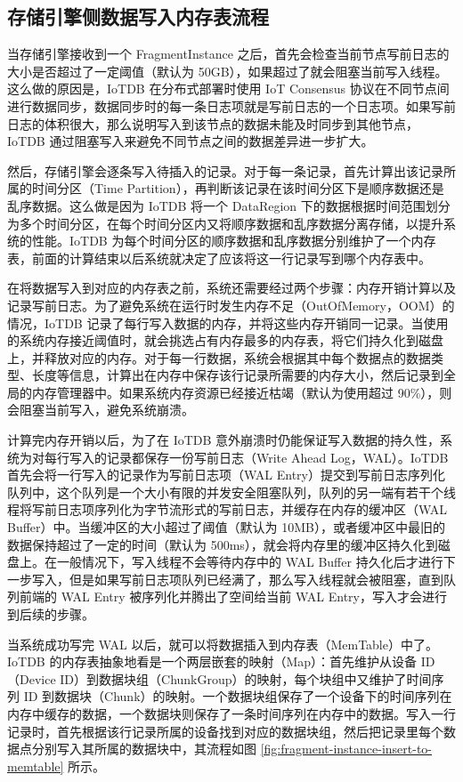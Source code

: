 \subsection{存储引擎侧数据写入内存表流程}
当存储引擎接收到一个 FragmentInstance 之后，首先会检查当前节点写前日志的大小是否超过了一定阈值（默认为 50GB），如果超过了就会阻塞当前写入线程。这么做的原因是，IoTDB 在分布式部署时使用 IoT Consensus 协议在不同节点间进行数据同步\cite{wang2023apache}，数据同步时的每一条日志项就是写前日志的一个日志项。如果写前日志的体积很大，那么说明写入到该节点的数据未能及时同步到其他节点，IoTDB 通过阻塞写入来避免不同节点之间的数据差异进一步扩大。

然后，存储引擎会逐条写入待插入的记录。对于每一条记录，首先计算出该记录所属的时间分区（Time Partition），再判断该记录在该时间分区下是顺序数据还是乱序数据。这么做是因为 IoTDB 将一个 DataRegion 下的数据根据时间范围划分为多个时间分区，在每个时间分区内又将顺序数据和乱序数据分离存储，以提升系统的性能。IoTDB 为每个时间分区的顺序数据和乱序数据分别维护了一个内存表，前面的计算结束以后系统就决定了应该将这一行记录写到哪个内存表中。

在将数据写入到对应的内存表之前，系统还需要经过两个步骤：内存开销计算以及记录写前日志。为了避免系统在运行时发生内存不足（OutOfMemory，OOM）的情况，IoTDB 记录了每行写入数据的内存，并将这些内存开销同一记录。当使用的系统内存接近阈值时，就会挑选占有内存最多的内存表，将它们持久化到磁盘上，并释放对应的内存。对于每一行数据，系统会根据其中每个数据点的数据类型、长度等信息，计算出在内存中保存该行记录所需要的内存大小，然后记录到全局的内存管理器中。如果系统内存资源已经接近枯竭（默认为使用超过 90\%），则会阻塞当前写入，避免系统崩溃。

计算完内存开销以后，为了在 IoTDB 意外崩溃时仍能保证写入数据的持久性，系统为对每行写入的记录都保存一份写前日志（Write Ahead Log，WAL）。IoTDB 首先会将一行写入的记录作为写前日志项（WAL Entry）提交到写前日志序列化队列中，这个队列是一个大小有限的并发安全阻塞队列，队列的另一端有若干个线程将写前日志项序列化为字节流形式的写前日志，并缓存在内存的缓冲区（WAL Buffer）中。当缓冲区的大小超过了阈值（默认为 10MB），或者缓冲区中最旧的数据保持超过了一定的时间（默认为 500ms），就会将内存里的缓冲区持久化到磁盘上\cite{朱海铭2023面向内存表的可动态配置预写日志框架}。在一般情况下，写入线程不会等待内存中的 WAL Buffer 持久化后才进行下一步写入，但是如果写前日志项队列已经满了，那么写入线程就会被阻塞，直到队列前端的 WAL Entry 被序列化并腾出了空间给当前 WAL Entry，写入才会进行到后续的步骤。

当系统成功写完 WAL 以后，就可以将数据插入到内存表（MemTable）中了。IoTDB 的内存表抽象地看是一个两层嵌套的映射（Map）：首先维护从设备 ID（Device ID）到数据块组（ChunkGroup）的映射，每个块组中又维护了时间序列 ID 到数据块（Chunk）的映射。一个数据块组保存了一个设备下的时间序列在内存中缓存的数据，一个数据块则保存了一条时间序列在内存中的数据。写入一行记录时，首先根据该行记录所属的设备找到对应的数据块组，然后把记录里每个数据点分别写入其所属的数据块中，其流程如图 \ref{fig:fragment-instance-insert-to-memtable} 所示。

